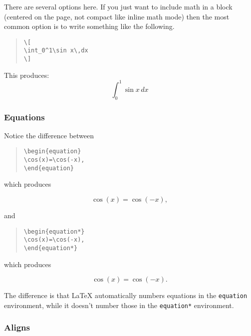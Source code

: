 \documentclass[letterpaper,twoside,10pt]{article}
\begin{document}
There are several options here. If you just want to include math in a block (centered on the page, not compact like inline math mode) then the most common option is to write something like the following.

\begin{quote}
\begin{verbatim}
\[
\int_0^1\sin x\,dx
\]
\end{verbatim}
\end{quote}

This produces:
\[
\int_0^1\sin x\,dx
\]

\subsubsection{Equations}

Notice the difference between

\begin{quote}
\begin{verbatim}
\begin{equation}
\cos(x)=\cos(-x),
\end{equation}
\end{verbatim}
\end{quote}

which produces

\begin{equation}
\cos(x)=\cos(-x),
\end{equation}

and 

\begin{quote}
\begin{verbatim}
\begin{equation*}
\cos(x)=\cos(-x),
\end{equation*}
\end{verbatim}
\end{quote}

which produces

\begin{equation*}
\cos(x)=\cos(-x).
\end{equation*}

The difference is that {\LaTeX} automatically numbers equations in the \verb!equation! environment, while it doesn't number those in the \verb!equation*! environment.

\subsubsection{Aligns}
\end{document}
